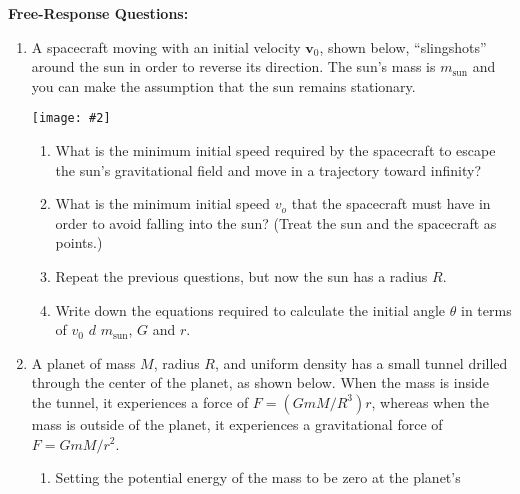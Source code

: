 \documentclass[12pt]{article}
\newcommand{\pic}[2]{\texttt{[image: \#2]}}
\newcommand{\mb}[1]{\mathbf{#1}}
\begin{document}
\newpage
\noindent\textbf{Free-Response Questions:}

\begin{enumerate}[leftmargin=15pt]

\item A spacecraft moving with an initial velocity $\mb{v}_0$, shown below,
  ``slingshots'' around the sun in order to reverse its direction. The sun's
  mass is $m_\mathrm{sun}$ and you can make the assumption that the sun remains
  stationary.\\
  \begin{minipage}{0.28\textwidth}
    \pic{1.25}{shuttle.jpg}
  \end{minipage}
  \begin{minipage}{0.7\textwidth}
    \begin{enumerate}[noitemsep]
    \item What is the minimum initial speed required by the spacecraft to escape
      the sun's gravitational field and move in a trajectory toward infinity?
    \item What is the minimum initial speed $v_o$ that the spacecraft must have
      in order to avoid falling into the sun? (Treat the sun and the spacecraft
      as points.)
    \item Repeat the previous questions, but now the sun has a radius $R$.
    \item Write down the equations required to calculate the initial angle
      $\theta$ in terms of $v_0$ $d$ $m_\mathrm{sun}$, $G$ and $r$.
    \end{enumerate}
  \end{minipage}
  \newpage
\item A planet of mass $M$, radius $R$, and uniform density has a small tunnel
  drilled through the center of the planet, as shown below. When the mass is
  inside the tunnel, it experiences a force of $F=(GmM/R^3)r$, whereas when the
  mass is outside of the planet, it experiences a gravitational force of
  $F=GmM/r^2$.
  \begin{center}
  \end{center}
  \begin{enumerate}[noitemsep,leftmargin=20pt]
  \item Setting the potential energy of the mass to be zero at the planet's

\end{enumerate}
\end{enumerate}
\end{document}
